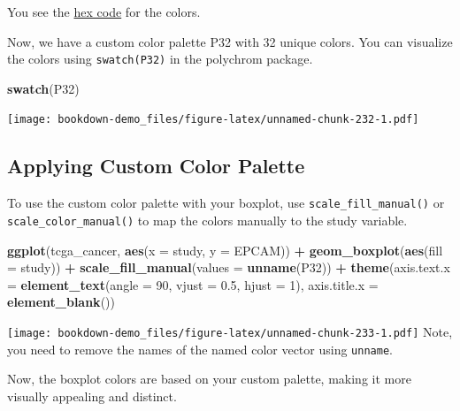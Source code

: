 \documentclass[
]{book}
\newenvironment{Shaded}{\begin{snugshade}}{\end{snugshade}}
\newcommand{\AttributeTok}[1]{\textcolor[rgb]{0.13,0.29,0.53}{#1}}
\newcommand{\DecValTok}[1]{\textcolor[rgb]{0.00,0.00,0.81}{#1}}
\newcommand{\FloatTok}[1]{\textcolor[rgb]{0.00,0.00,0.81}{#1}}
\newcommand{\FunctionTok}[1]{\textcolor[rgb]{0.13,0.29,0.53}{\textbf{#1}}}
\newcommand{\NormalTok}[1]{#1}
\newcommand{\SpecialCharTok}[1]{\textcolor[rgb]{0.81,0.36,0.00}{\textbf{#1}}}
\begin{document}
You see the \href{https://en.wikipedia.org/wiki/Web_colors}{hex code} for the colors.

Now, we have a custom color palette P32 with 32 unique colors. You can visualize the colors using \texttt{swatch(P32)} in the polychrom package.

\begin{Shaded}
\begin{Highlighting}[]
\FunctionTok{swatch}\NormalTok{(P32)}
\end{Highlighting}
\end{Shaded}

\texttt{[image: bookdown-demo\_files/figure-latex/unnamed-chunk-232-1.pdf]}

\hypertarget{applying-custom-color-palette}{%
\subsection{Applying Custom Color Palette}\label{applying-custom-color-palette}}

To use the custom color palette with your boxplot, use \texttt{scale\_fill\_manual()} or \texttt{scale\_color\_manual()} to map the colors manually to the study variable.

\begin{Shaded}
\begin{Highlighting}[]
\FunctionTok{ggplot}\NormalTok{(tcga\_cancer, }\FunctionTok{aes}\NormalTok{(}\AttributeTok{x =}\NormalTok{ study, }\AttributeTok{y =}\NormalTok{ EPCAM)) }\SpecialCharTok{+}
  \FunctionTok{geom\_boxplot}\NormalTok{(}\FunctionTok{aes}\NormalTok{(}\AttributeTok{fill =}\NormalTok{ study)) }\SpecialCharTok{+}
  \FunctionTok{scale\_fill\_manual}\NormalTok{(}\AttributeTok{values =} \FunctionTok{unname}\NormalTok{(P32)) }\SpecialCharTok{+}
  \FunctionTok{theme}\NormalTok{(}\AttributeTok{axis.text.x =} \FunctionTok{element\_text}\NormalTok{(}\AttributeTok{angle =} \DecValTok{90}\NormalTok{, }\AttributeTok{vjust =} \FloatTok{0.5}\NormalTok{, }\AttributeTok{hjust =} \DecValTok{1}\NormalTok{),}
        \AttributeTok{axis.title.x =} \FunctionTok{element\_blank}\NormalTok{())}
\end{Highlighting}
\end{Shaded}

\texttt{[image: bookdown-demo\_files/figure-latex/unnamed-chunk-233-1.pdf]}
Note, you need to remove the names of the named color vector using \texttt{unname}.

Now, the boxplot colors are based on your custom palette, making it more visually appealing and distinct.
\end{document}
